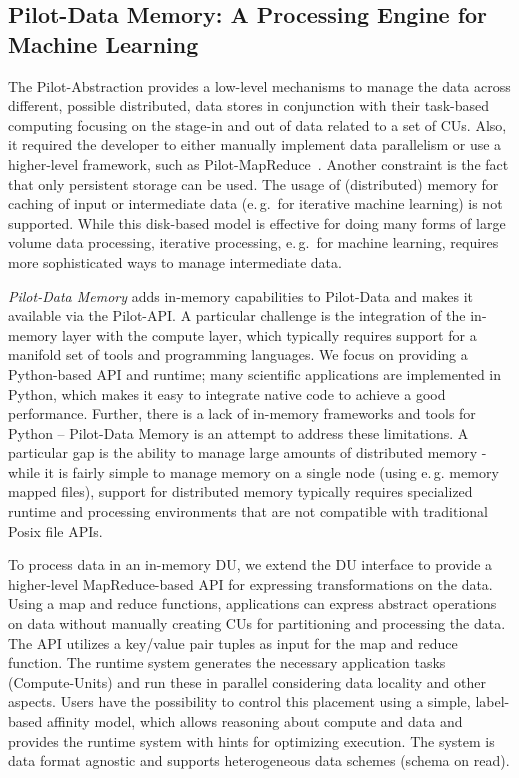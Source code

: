 \documentclass{sig-alternate}
\newcommand{\pilot}{Pilot\xspace}
\newcommand{\pilotdata}{Pilot-Data\xspace}
\newcommand{\pilotdatainmem}{Pilot-Data Memory\xspace}
\newcommand{\computeunits}{Compute-Units\xspace}
\newcommand{\du}{DU\xspace}
\newcommand{\cus}{CUs\xspace}
\begin{document}
\subsection{\pilotdatainmem: A Processing Engine for Machine Learning}
\label{sec:pilotinmem}

The \pilot-Abstraction provides a low-level mechanisms to manage the data
across different, possible distributed, data stores in conjunction with their
task-based computing focusing on the stage-in and out of data related to a set
of \cus. Also, it required the developer to either manually implement data
parallelism or use a higher-level framework, such as
Pilot-MapReduce~\cite{Mantha:2012:PEF:2287016.2287020}. Another constraint is
the fact that only persistent storage can be used. The usage of (distributed)
memory for caching of input or intermediate data (e.\,g.\ for iterative machine
learning) is not supported. While this disk-based model is effective for doing
many forms of large volume data processing, iterative processing, e.\,g.\ for
machine learning, requires more sophisticated ways to manage intermediate data.


\emph{\pilotdatainmem} adds in-memory capabilities to \pilotdata
and makes it available via the \pilot-API. A particular
challenge is the integration of the in-memory layer with the compute
layer, which typically requires support for a manifold set of tools and programming languages. We focus on providing a Python-based API and runtime;
many scientific applications are implemented in Python, which makes it
easy to integrate native code to achieve a good performance. 
Further, there is a lack of in-memory frameworks and tools for Python --
\pilotdatainmem is an attempt to address these limitations. A
particular gap is the ability to manage large amounts of distributed
memory - while it is fairly simple to manage memory on a single node
(using e.\,g. memory mapped files), support for distributed memory
typically requires specialized runtime and processing environments
that are not compatible with traditional Posix file APIs.

To process data in an in-memory \du, we extend the \du interface to
provide a higher-level MapReduce-based API for expressing
transformations on the data. Using a map and reduce functions,
applications can express abstract operations on data
without manually creating \cus for partitioning and processing the
data. The API utilizes a key/value pair tuples as input for the map
and reduce function. The runtime system generates the necessary
application tasks (\computeunits) and run these in parallel
considering data locality and other aspects. Users have the
possibility to control this placement using a simple, label-based
affinity model, which allows reasoning about compute and data and
provides the runtime system with hints for optimizing execution. The
system is data format agnostic and supports heterogeneous data schemes
(schema on read).
\end{document}
